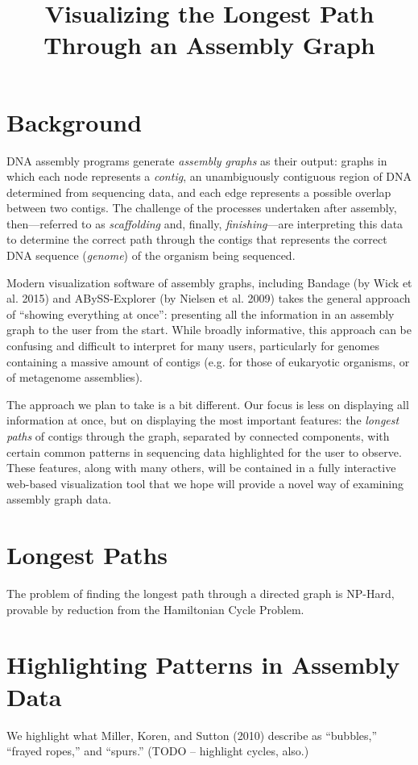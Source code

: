 \documentclass[12pt]{article}
\begin{document}
\title{Visualizing the Longest Path Through an Assembly Graph}
\maketitle

\section{Background}

DNA assembly programs generate \emph{assembly graphs} as their output:
graphs in which each node represents a \emph{contig}, an unambiguously
contiguous region of DNA determined from sequencing data, and each edge
represents a possible overlap between two contigs. The challenge of the
processes undertaken after assembly, then---referred to as
\emph{scaffolding} and, finally, \emph{finishing}---are interpreting
this data to determine the correct path through the contigs that represents
the correct DNA sequence (\emph{genome}) of the organism being sequenced.

Modern visualization software of assembly graphs, including Bandage (by Wick
et al. 2015) and ABySS-Explorer (by Nielsen et al. 2009) takes the general
approach of ``showing everything at once'': presenting all the information
in an assembly graph to the user from the start. While broadly informative,
this approach can be confusing and difficult to interpret for many users,
particularly for
genomes containing a massive amount of contigs (e.g. for those of eukaryotic
organisms, or of metagenome assemblies).

The approach we plan to take is a bit different. Our focus is less on
displaying all information at once, but on displaying the most important
features: the \emph{longest paths} of contigs through the graph, separated
by connected components, with certain common patterns in sequencing data
highlighted for the user to observe. These features, along with many others,
will be contained in a fully interactive web-based visualization tool that
we hope will provide a novel way of examining assembly graph data.

\section{Longest Paths}

The problem of finding the longest path through a directed graph is
NP-Hard, provable by reduction from the Hamiltonian Cycle Problem.

\section{Highlighting Patterns in Assembly Data}

We highlight what Miller, Koren, and Sutton (2010) describe as ``bubbles,''
``frayed ropes,'' and ``spurs.'' (TODO -- highlight cycles, also.)
\end{document}

